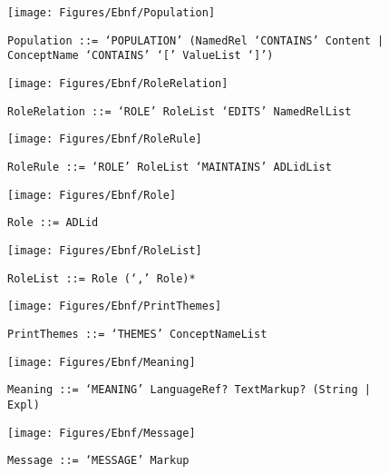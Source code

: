  \begin{figure}[H]
  \centering
  \texttt{[image: Figures/Ebnf/Population]}
  \caption*{\texttt{Population \small::=  `POPULATION' (NamedRel `CONTAINS' Content | ConceptName `CONTAINS' `[' ValueList `]')}}
  \label{fig:ebnf-Population}
 \end{figure}

 \begin{figure}[H]
  \centering
  \texttt{[image: Figures/Ebnf/RoleRelation]}
  \caption*{\texttt{RoleRelation \small::=  `ROLE' RoleList `EDITS' NamedRelList}}
  \label{fig:ebnf-RoleRelation}
 \end{figure}

 \begin{figure}[H]
  \centering
  \texttt{[image: Figures/Ebnf/RoleRule]}
  \caption*{\texttt{RoleRule \small::=  `ROLE' RoleList `MAINTAINS' ADLidList}}
  \label{fig:ebnf-RoleRule}
 \end{figure}

 \begin{figure}[H]
  \centering
  \texttt{[image: Figures/Ebnf/Role]}
  \caption*{\texttt{Role \small::=  ADLid}}
  \label{fig:ebnf-Role}
 \end{figure}

 \begin{figure}[H]
  \centering
  \texttt{[image: Figures/Ebnf/RoleList]}
  \caption*{\texttt{RoleList \small::=  Role (`,' Role)*}}
  \label{fig:ebnf-RoleList}
 \end{figure}

 \begin{figure}[H]
  \centering
  \texttt{[image: Figures/Ebnf/PrintThemes]}
  \caption*{\texttt{PrintThemes \small::=  `THEMES' ConceptNameList}}
  \label{fig:ebnf-PrintThemes}
 \end{figure}

 \begin{figure}[H]
  \centering
  \texttt{[image: Figures/Ebnf/Meaning]}
  \caption*{\texttt{Meaning \small::=  `MEANING' LanguageRef? TextMarkup? (String | Expl)}}
  \label{fig:ebnf-Meaning}
 \end{figure}

 \begin{figure}[H]
  \centering
  \texttt{[image: Figures/Ebnf/Message]}
  \caption*{\texttt{Message \small::=  `MESSAGE' Markup}}
  \label{fig:ebnf-Message}
 \end{figure}

